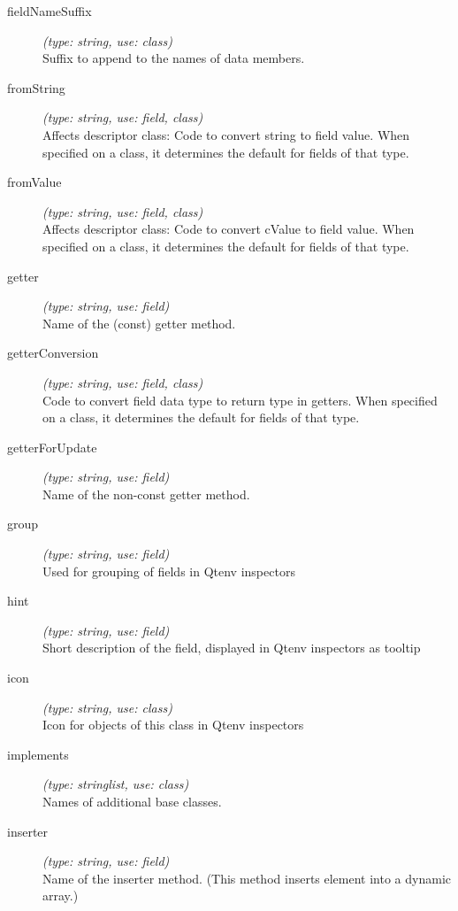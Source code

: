 \begin{description}
\item[fieldNameSuffix] \textit{(type: string, use: class)} \\
  Suffix to append to the names of data members.

\item[fromString] \textit{(type: string, use: field, class)} \\
  Affects descriptor class: Code to convert string to field value. When
  specified on a class, it determines the default for fields of that type.

\item[fromValue] \textit{(type: string, use: field, class)} \\
  Affects descriptor class: Code to convert cValue to field value. When
  specified on a class, it determines the default for fields of that type.

\item[getter] \textit{(type: string, use: field)} \\
  Name of the (const) getter method.

\item[getterConversion] \textit{(type: string, use: field, class)} \\
  Code to convert field data type to return type in getters. When specified on
  a class, it determines the default for fields of that type.

\item[getterForUpdate] \textit{(type: string, use: field)} \\
  Name of the non-const getter method.

\item[group] \textit{(type: string, use: field)} \\
  Used for grouping of fields in Qtenv inspectors

\item[hint] \textit{(type: string, use: field)} \\
  Short description of the field, displayed in Qtenv inspectors as tooltip

\item[icon] \textit{(type: string, use: class)} \\
  Icon for objects of this class in Qtenv inspectors

\item[implements] \textit{(type: stringlist, use: class)} \\
  Names of additional base classes.

\item[inserter] \textit{(type: string, use: field)} \\
  Name of the inserter method. (This method inserts element into a dynamic
  array.)


\end{description}
